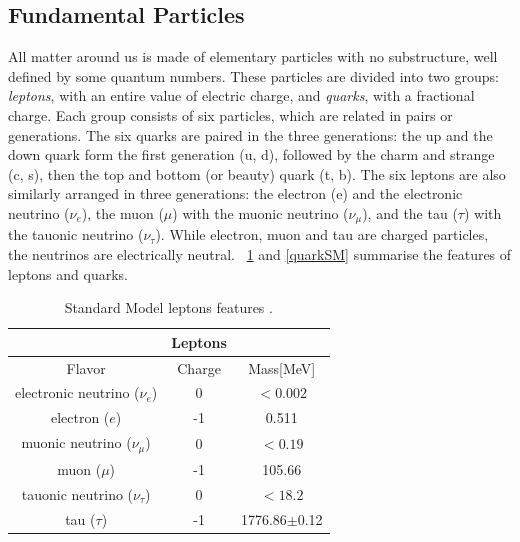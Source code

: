 \subsection{Fundamental Particles}
\label{cap1:pi}
All matter around us is made of elementary particles with no substructure, well defined by some quantum numbers. These particles are divided into two groups: \textit{leptons}, with an entire value of electric charge, and \textit{quarks}, with a fractional charge. Each group consists of six particles, which are related in pairs or generations. The six quarks are paired in the three generations: the up and the down quark form the first generation (u, d), followed by the charm and strange  (c, s), then the top and bottom (or beauty) quark (t, b).  The six leptons are also similarly arranged in three generations: the electron (e) and the electronic neutrino ($\nu_{e}$), the muon ($\mu$)  with the muonic neutrino ($\nu_{\mu}$), and the tau ($\tau$) with the tauonic neutrino ($\nu_{\tau}$). While electron, muon and tau are charged particles, the neutrinos are electrically neutral. \tablename~\ref{leptonsSM} and \ref{quarkSM} summarise the features of leptons and quarks.
\begin{table}[ht]	
	\begin{center}
		\begin{tabular}{|ccc|}
			\hline     & \textbf{Leptons} &   \\
			\hline   Flavor & Charge & Mass[MeV]  \\
			\hline
			\hline
			electronic neutrino ($\nu_{e}$) & 0 & $<0.002$   \\
			electron ($e$) & -1 & 0.511   \\
			\hline
			muonic neutrino ($\nu_{\mu}$) & 0 & $<0.19$   \\
			muon ($\mu$) & -1 & 105.66   \\
			\hline
			tauonic neutrino ($\nu_{\tau}$) & 0 & $<18.2$ \\
			tau ($\tau$) & -1 & 1776.86$\pm$0.12  \\
			\hline
			\hline
		\end{tabular}
	\end{center}
	\caption{Standard Model leptons features \cite{PDG}.}
	\label{leptonsSM}
\end{table}

